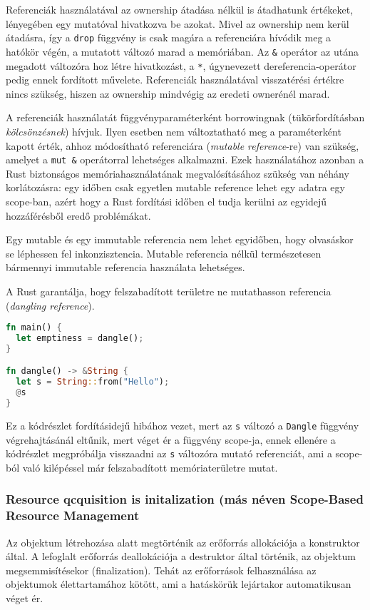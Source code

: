 Referenciák használatával az ownership átadása nélkül is átadhatunk értékeket, lényegében egy mutatóval hivatkozva be azokat. Mivel az ownership nem kerül átadásra, így a \lstinline{drop} függvény is csak magára a referenciára hívódik meg a hatókör végén, a mutatott változó marad a memóriában. Az \lstinline{&} operátor az utána megadott változóra hoz létre hivatkozást, a \lstinline{*}, úgynevezett dereferencia-operátor pedig ennek fordított művelete.
Referenciák használatával visszatérési értékre nincs szükség, hiszen az ownership mindvégig az eredeti ownerénél marad.

A referenciák használatát függvényparaméterként borrowingnak (tükörfordításban \textit{kölcsönzésnek}) hívjuk. Ilyen esetben nem változtatható meg a paraméterként kapott érték, ahhoz módosítható referenciára (\textit{mutable reference}-re) van szükség, amelyet a \lstinline{mut &} operátorral lehetséges alkalmazni. Ezek használatához azonban a Rust biztonságos memóriahasználatának megvalósításához szükség van néhány korlátozásra: egy időben csak egyetlen mutable reference lehet egy adatra egy scope-ban, azért hogy a Rust fordítási időben el tudja kerülni az egyidejű hozzáférésből eredő problémákat.

Egy mutable és egy immutable referencia nem lehet egyidőben, hogy olvasáskor se léphessen fel inkonzisztencia. Mutable referencia nélkül természetesen bármennyi immutable referencia használata lehetséges.

A Rust garantálja, hogy felszabadított területre ne mutathasson referencia (\textit{dangling reference}).
\begin{lstlisting}[language=Rust, style=boxed]
fn main() {
  let emptiness = dangle();
}

fn dangle() -> &String {
  let s = String::from("Hello");
  @s
}
\end{lstlisting}
Ez a kódrészlet fordításidejű hibához vezet, mert az \lstinline{s} változó a \lstinline{Dangle} függvény végrehajtásánál eltűnik, mert véget ér a függvény scope-ja, ennek ellenére a kódrészlet megpróbálja visszaadni az \lstinline{s} változóra mutató referenciát, ami a scope-ból való kilépéssel már felszabadított memóriaterületre mutat.

\subsubsection{Resource qcquisition is initalization (más néven Scope-Based Resource Management}
Az objektum létrehozása alatt megtörténik az erőforrás allokációja a konstruktor által. A lefoglalt erőforrás deallokációja a destruktor által történik, az objektum megsemmisítésekor (finalization).  Tehát az erőforrások felhasználása az objektumok élettartamához kötött, ami a hatáskörük lejártakor automatikusan véget ér.

